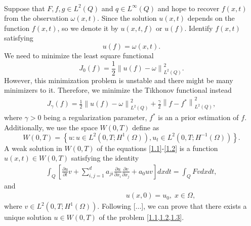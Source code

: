 \documentclass[notitlepage,a4paper,fleqn,9pt]{icmfarticle}
\begin{document}
\begin{multicols}{2}
\\
Suppose that $F, f, g \in L^2(Q)$ and $ q\in L^\infty(Q)$ and hope to recover $f(x, t)$ from the observation $\omega(x, t)$. Since the solution $u(x, t)$ depends on the function $f(x, t)$, so we denote it by $u(x, t, f)$ or $u(f)$. Identify $f(x, t)$ satisfying 
$$u(f)=\omega(x, t).$$ We need to minimize the least square functional \cite{}
$$J_0(f)=\frac{1}{2}\left\|u(f)-\omega\right\|_{L^2(Q)}^2.$$
However, this minimization problem is unstable and there might be many minimizers to it. Therefore, we minimize the Tikhonov functional instead
\begin{align}\label{1.4}
	J_{\gamma}(f)=\frac{1}{2}\left\|u(f)-\omega\right\|_{L^2(Q)}^2+\frac{\gamma}{2}\left\|f-f^*\right\|_{L^2(Q)}^2,
\end{align}
where $\gamma>0$ being a regularization parameter, $f^*$ is an a prior estimation of $f$.
\\
Additionally, we use the space $W(0, T)$ define as
$$W(0, T)=\left\{u: u\in L^2(0, T; H^1(\Omega)), u_t\in L^2\left(0, T; H^{-1}(\Omega) \right)\right\}.$$
A weak solution in $W(0, T)$ of the equations \eqref{1.1}-\eqref{1.2} is a function $u(x, t)\in W(0, T)$ satisfying the identity
\begin{align}\label{1.5}
	\int_{Q}\left[\frac{\partial u}{\partial t}v+\sum_{i, j=1}^{d}a_{ji}\frac{\partial u}{\partial x_i}\frac{\partial v}{\partial x_j}+a_0uv\right]dxdt=\int_{Q}Fvdxdt,
\end{align}
and 
\begin{align}\label{1.6}
\qquad\qquad\qquad\qquad\; u(x, 0)=u_0,\; x\in \Omega,
\end{align}
where $ v \in L^2\left(0, T; H^1(\Omega)\right)$.
Following [...], we can prove that there exists a unique solution $u\in W(0, T)$ of the problem \cref{1.1,1.2,1.3}. 


\end{multicols}
\end{document}
